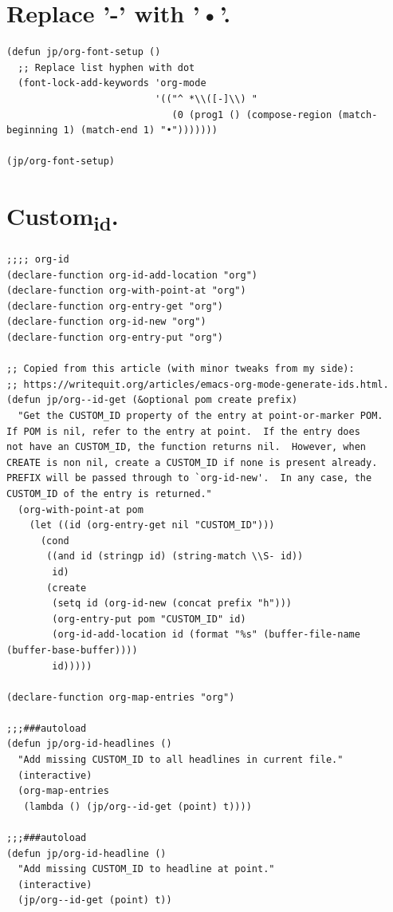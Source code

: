 \documentclass[11pt]{article}
\begin{document}
\section{Replace '-' with '•'.}
\label{sec:org59e525d}
\begin{verbatim}
(defun jp/org-font-setup ()
  ;; Replace list hyphen with dot
  (font-lock-add-keywords 'org-mode
                          '(("^ *\\([-]\\) "
                             (0 (prog1 () (compose-region (match-beginning 1) (match-end 1) "•")))))))

(jp/org-font-setup)
\end{verbatim}
\section{Custom\textsubscript{id}.}
\label{sec:org15e0341}
\begin{verbatim}
;;;; org-id
(declare-function org-id-add-location "org")
(declare-function org-with-point-at "org")
(declare-function org-entry-get "org")
(declare-function org-id-new "org")
(declare-function org-entry-put "org")

;; Copied from this article (with minor tweaks from my side):
;; https://writequit.org/articles/emacs-org-mode-generate-ids.html.
(defun jp/org--id-get (&optional pom create prefix)
  "Get the CUSTOM_ID property of the entry at point-or-marker POM.
If POM is nil, refer to the entry at point.  If the entry does
not have an CUSTOM_ID, the function returns nil.  However, when
CREATE is non nil, create a CUSTOM_ID if none is present already.
PREFIX will be passed through to `org-id-new'.  In any case, the
CUSTOM_ID of the entry is returned."
  (org-with-point-at pom
    (let ((id (org-entry-get nil "CUSTOM_ID")))
      (cond
       ((and id (stringp id) (string-match \\S- id))
        id)
       (create
        (setq id (org-id-new (concat prefix "h")))
        (org-entry-put pom "CUSTOM_ID" id)
        (org-id-add-location id (format "%s" (buffer-file-name (buffer-base-buffer))))
        id)))))

(declare-function org-map-entries "org")

;;;###autoload
(defun jp/org-id-headlines ()
  "Add missing CUSTOM_ID to all headlines in current file."
  (interactive)
  (org-map-entries
   (lambda () (jp/org--id-get (point) t))))

;;;###autoload
(defun jp/org-id-headline ()
  "Add missing CUSTOM_ID to headline at point."
  (interactive)
  (jp/org--id-get (point) t))
\end{verbatim}
\end{document}
